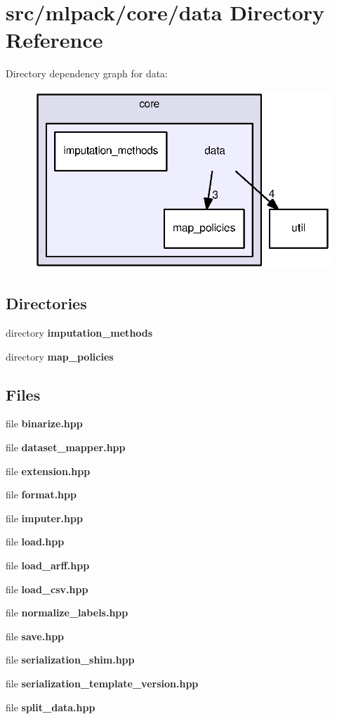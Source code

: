 \section{src/mlpack/core/data Directory Reference}
\label{dir_96b57488436375c38fa22c0899d60308}
Directory dependency graph for data\+:
\nopagebreak
\begin{figure}[H]
\begin{center}
\leavevmode
\includegraphics[width=322pt]{dir_96b57488436375c38fa22c0899d60308_dep}
\end{center}
\end{figure}
\subsection*{Directories}
\begin{DoxyCompactItemize}
\item 
directory {\bf imputation\+\_\+methods}
\item 
directory {\bf map\+\_\+policies}
\end{DoxyCompactItemize}
\subsection*{Files}
\begin{DoxyCompactItemize}
\item 
file {\bf binarize.\+hpp}
\item 
file {\bf dataset\+\_\+mapper.\+hpp}
\item 
file {\bf extension.\+hpp}
\item 
file {\bf format.\+hpp}
\item 
file {\bf imputer.\+hpp}
\item 
file {\bf load.\+hpp}
\item 
file {\bf load\+\_\+arff.\+hpp}
\item 
file {\bf load\+\_\+csv.\+hpp}
\item 
file {\bf normalize\+\_\+labels.\+hpp}
\item 
file {\bf save.\+hpp}
\item 
file {\bf serialization\+\_\+shim.\+hpp}
\item 
file {\bf serialization\+\_\+template\+\_\+version.\+hpp}
\item 
file {\bf split\+\_\+data.\+hpp}
\end{DoxyCompactItemize}
